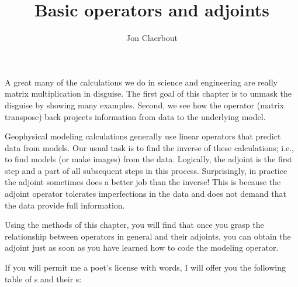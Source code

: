 
\title{Basic operators and adjoints}
\author{Jon Claerbout}
\maketitle

\label{paper:ajt}

A great many of the calculations
we do in science and engineering
are really matrix multiplication in disguise.
The first goal of this chapter is to unmask the disguise
by showing many examples.
Second, we see how the 
 operator (matrix transpose)
back projects information from data to the underlying model.

\par
Geophysical modeling calculations
generally use linear operators that predict data from models.
Our usual task is to find the inverse of these calculations;
i.e., to find models (or make images) from the data.
Logically, the adjoint is the first step
and a part of all subsequent steps in this  process.
Surprisingly, in practice the adjoint sometimes does a better job
than the inverse!
This is because the adjoint operator tolerates imperfections
in the data and does not demand that the data provide full information.

\par
Using the methods of this chapter,
you will find that
once you grasp the relationship between operators in general
and their adjoints,
you can obtain the adjoint just
as soon as you have learned how to code
the modeling operator.

\par
If you will permit me a poet's license with words,
I will offer you the following table
of s and their s: 

